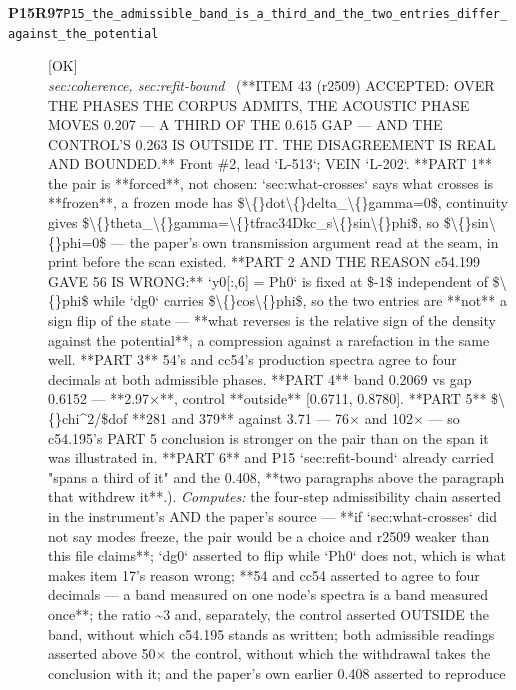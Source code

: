 \begin{description}
\item[\textbf{P15R97}\quad\texttt{P15\_the\_admissible\_band\_is\_a\_third\_and\_the\_two\_entries\_differ\_against\_the\_potential}]\hfill\textsf{[OK]}\\
\textit{sec:coherence, sec:refit-bound} \ (**ITEM 43 (r2509) ACCEPTED: OVER THE PHASES THE CORPUS ADMITS, THE ACOUSTIC PHASE MOVES 0.207 --- A THIRD OF THE 0.615 GAP --- AND THE CONTROL'S 0.263 IS OUTSIDE IT. THE DISAGREEMENT IS REAL AND BOUNDED.** Front \#2, lead `L-513`; VEIN `L-202`. **PART 1** the pair is **forced**, not chosen: `sec:what-crosses` says what crosses is **frozen**, a frozen mode has \$\textbackslash\{\}dot\textbackslash\{\}delta\_\textbackslash\{\}gamma=0\$, continuity gives \$\textbackslash\{\}theta\_\textbackslash\{\}gamma=\textbackslash\{\}tfrac34Dkc\_s\textbackslash\{\}sin\textbackslash\{\}phi\$, so \$\textbackslash\{\}sin\textbackslash\{\}phi=0\$ --- the paper's own transmission argument read at the seam, in print before the scan existed. **PART 2 AND THE REASON c54.199 GAVE 56 IS WRONG:** `y0[:,6] = Ph0` is fixed at \$-1\$ independent of \$\textbackslash\{\}phi\$ while `dg0` carries \$\textbackslash\{\}cos\textbackslash\{\}phi\$, so the two entries are **not** a sign flip of the state --- **what reverses is the relative sign of the density against the potential**, a compression against a rarefaction in the same well. **PART 3** 54's and cc54's production spectra agree to four decimals at both admissible phases. **PART 4** band 0.2069 vs gap 0.6152 --- **2.97\ensuremath{\times}**, control **outside** [0.6711, 0.8780]. **PART 5** \$\textbackslash\{\}chi\textasciicircum{}2/\$dof **281 and 379** against 3.71 --- 76\ensuremath{\times} and 102\ensuremath{\times} --- so c54.195's PART 5 conclusion is stronger on the pair than on the span it was illustrated in. **PART 6** and P15 `sec:refit-bound` already carried "spans a third of it" and the 0.408, **two paragraphs above the paragraph that withdrew it**.). 
\emph{Computes:} the four-step admissibility chain asserted in the instrument's AND the paper's source --- **if `sec:what-crosses` did not say modes freeze, the pair would be a choice and r2509 weaker than this file claims**; `dg0` asserted to flip while `Ph0` does not, which is what makes item 17's reason wrong; **54 and cc54 asserted to agree to four decimals --- a band measured on one node's spectra is a band measured once**; the ratio \textasciitilde{}3 and, separately, the control asserted OUTSIDE the band, without which c54.195 stands as written; both admissible readings asserted above 50\ensuremath{\times} the control, without which the withdrawal takes the conclusion with it; and the paper's own earlier 0.408 asserted to reproduce

\end{description}
